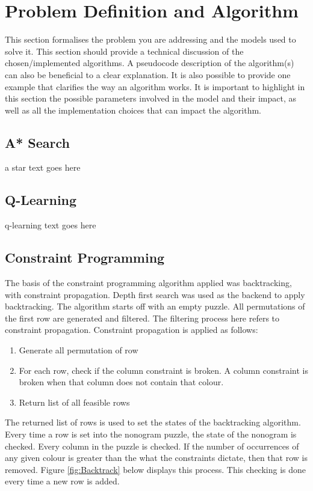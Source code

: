 \documentclass{svproc}
\begin{document}
\section{Problem Definition and Algorithm}
This section formalises the problem you are addressing and the models used to solve it. This section should provide a technical discussion of the chosen/implemented algorithms. A pseudocode description of the algorithm(s) can also be beneficial to a clear explanation. It is also possible to provide one example that clarifies the way an algorithm works. It is important to highlight in this section the possible parameters involved in the model and their impact, as well as all the implementation choices that can impact the algorithm.

\subsection{A* Search}
a star text goes here

\subsection{Q-Learning}
q-learning text goes here

\subsection{Constraint Programming}
The basis of the constraint programming algorithm applied was backtracking, with constraint propagation. Depth first search was used as the backend to apply backtracking. The algorithm starts off with an empty puzzle. All permutations of the first row are generated and filtered. The filtering process here refers to  constraint propagation. Constraint propagation is applied as follows:

\begin{enumerate}
    \item Generate all permutation of row
    \item For each row, check if the column constraint is broken. A column constraint is broken when that column does not contain that colour.
    \item Return list of all feasible rows
\end{enumerate}

The returned list of rows is used to set the states of the backtracking algorithm. Every time a row is set into the nonogram puzzle, the state of the nonogram is checked. Every column in the puzzle is checked. If the number of occurrences of any given colour is greater than the what the constraints dictate, then that row is removed. Figure \ref{fig:Backtrack} below displays this process. This checking is done every time a new row is added.
\end{document}
